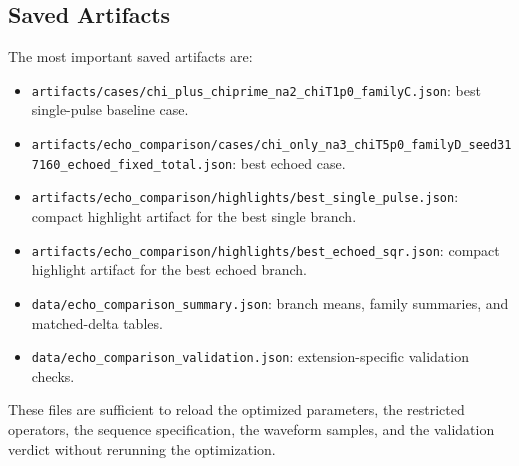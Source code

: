\documentclass[aps,pra,twocolumn,reprint,floatfix,amsmath,amssymb]{revtex4-2}
\begin{document}
\subsection{Saved Artifacts}
The most important saved artifacts are:
\begin{itemize}
  \item \texttt{artifacts/cases/chi\_plus\_chiprime\_na2\_chiT1p0\_familyC.json}: best single-pulse baseline case.
  \item \texttt{artifacts/echo\_comparison/cases/chi\_only\_na3\_chiT5p0\_familyD\_seed317160\_echoed\_fixed\_total.json}: best echoed case.
  \item \texttt{artifacts/echo\_comparison/highlights/best\_single\_pulse.json}: compact highlight artifact for the best single branch.
  \item \texttt{artifacts/echo\_comparison/highlights/best\_echoed\_sqr.json}: compact highlight artifact for the best echoed branch.
  \item \texttt{data/echo\_comparison\_summary.json}: branch means, family summaries, and matched-delta tables.
  \item \texttt{data/echo\_comparison\_validation.json}: extension-specific validation checks.
\end{itemize}
These files are sufficient to reload the optimized parameters, the restricted operators, the sequence specification, the waveform samples, and the validation verdict without rerunning the optimization.
\end{document}
